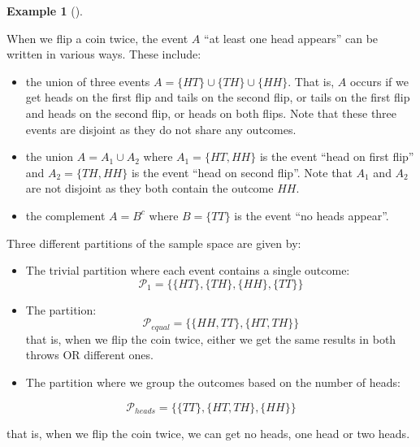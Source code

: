 \documentclass[
  letterpaper,
  DIV=11,
  numbers=noendperiod]{scrreport}
\theoremstyle{definition}
\newtheorem{example}{Example}[chapter]
\theoremstyle{plain}
\theoremstyle{plain}
\theoremstyle{definition}
\theoremstyle{remark}
\begin{document}
\begin{tcolorbox}[enhanced jigsaw, opacitybacktitle=0.6, bottomtitle=1mm, opacityback=0, toprule=.15mm, colbacktitle=quarto-callout-note-color!10!white, colback=white, left=2mm, title={Representation of events using set operations}, breakable, rightrule=.15mm, leftrule=.75mm, titlerule=0mm, colframe=quarto-callout-note-color-frame, arc=.35mm, coltitle=black, toptitle=1mm, bottomrule=.15mm]

\begin{example}[]\protect\hypertarget{exm-union}{}\label{exm-union}

When we flip a coin twice, the event \(A\) ``at least one head appears''
can be written in various ways. These include:

\begin{itemize}
\item
  the union of three events \(A = \{HT\} \cup \{TH\} \cup \{HH\}\). That
  is, \(A\) occurs if we get heads on the first flip and tails on the
  second flip, or tails on the first flip and heads on the second flip,
  or heads on both flips. Note that these three events are disjoint as
  they do not share any outcomes.
\item
  the union \(A = A_1 \cup A_2\) where \(A_1 = \{HT, HH\}\) is the event
  ``head on first flip'' and \(A_2 = \{TH, HH\}\) is the event ``head on
  second flip''. Note that \(A_1\) and \(A_2\) are not disjoint as they
  both contain the outcome \(HH\).
\item
  the complement \(A = B^c\) where \(B = \{TT\}\) is the event ``no
  heads appear''.
\end{itemize}

Three different partitions of the sample space are given by:

\begin{itemize}
\item
  The trivial partition where each event contains a single outcome: \[
  \mathcal P_1=\{\{HT\},\{TH\},\{HH\},\{TT\}\}
  \]
\item
  The partition: \[
  \mathcal P_{equal}=\{\{HH,TT\}, \{HT,TH\}\}
  \] that is, when we flip the coin twice, either we get the same
  results in both throws OR different ones.
\item
  The partition where we group the outcomes based on the number of
  heads:
\end{itemize}

\[
\mathcal P_{heads} =\{\{TT\}, \{HT,TH\}, \{HH\}\}
\]

that is, when we flip the coin twice, we can get no heads, one head or
two heads.

\end{example}

\end{tcolorbox}
\end{document}
